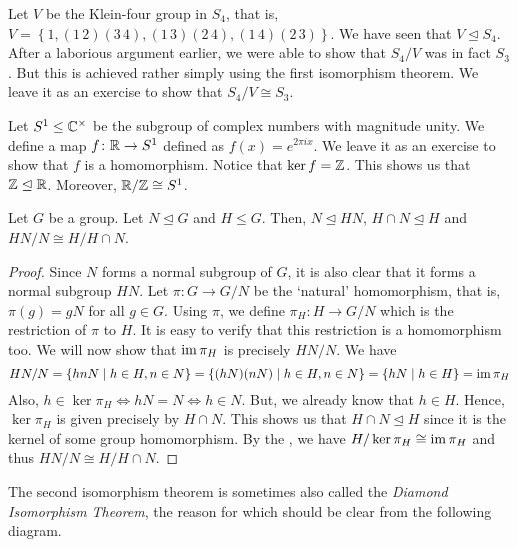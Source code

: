 Let $V$ be the Klein-four group in $S_4$, that is, $V = \left\{ 1, (1\, 2)(3\, 4), (1\, 3)(2\, 4), (1\, 4)(2\, 3) \right\}$. We have seen that $V \trianglelefteq S_4$. After a laborious argument earlier, we were able to show that $S_4/V$ was in fact $S_3$. But this is achieved rather simply using the first isomorphism theorem. We leave it as an exercise to show that $S_4/V \cong S_3$.

\medskip

Let $S^1 \leq \mathbb{C}^{\times}$ be the subgroup of complex numbers with magnitude unity. We define a map $f \colon \mathbb{R} \to S^1$ defined as $f(x) = e^{2\pi ix}$. We leave it as an exercise to show that $f$ is a homomorphism. Notice that $\ker f = \mathbb{Z}$. This shows us that $\mathbb{Z} \trianglelefteq \mathbb{R}$. Moreover, $\mathbb{R}/\mathbb{Z} \cong S^1$.

\begin{theorem} \label{thm:iso2}
    Let $G$ be a group. Let $N \trianglelefteq G$ and $H \leq G$. Then, $N \trianglelefteq HN$, $H\cap N \trianglelefteq H$ and $HN/N \cong H/H\cap N$.
\end{theorem}
\begin{proof}
    Since $N$ forms a normal subgroup of $G$, it is also clear that it forms a normal subgroup $HN$. Let $\pi \colon G \to G/N$ be the `natural' homomorphism, that is, $\pi(g) = gN$ for all $g \in G$. Using $\pi$, we define $\pi_H \colon H \to G/N$ which is the restriction of $\pi$ to $H$. It is easy to verify that this restriction is a homomorphism too. We will now show that $\operatorname{im}\pi_H$ is precisely $HN/N$. We have
    \[
        HN/N = \left\{ hnN \mid h \in H, n \in N \right\} = \left\{ (hN)(nN) \mid h \in H, n \in N \right\} = \left\{ hN \mid h \in H \right\} = \operatorname{im}\pi_H
    \]
    Also, $h \in \ker\pi_H \iff hN = N \iff h \in N$. But, we already know that $h \in H$. Hence, $\ker\pi_H$ is given precisely by $H \cap N$. This shows us that $H \cap N \trianglelefteq H$ since it is the kernel of some group homomorphism. By the , we have $H/\ker\pi_H \cong \operatorname{im}\pi_H$ and thus $HN/N \cong H/H\cap N$.
\end{proof}

The second isomorphism theorem is sometimes also called the \emph{Diamond Isomorphism Theorem}, the reason for which should be clear from the following diagram.

\begin{center}
\end{center}

